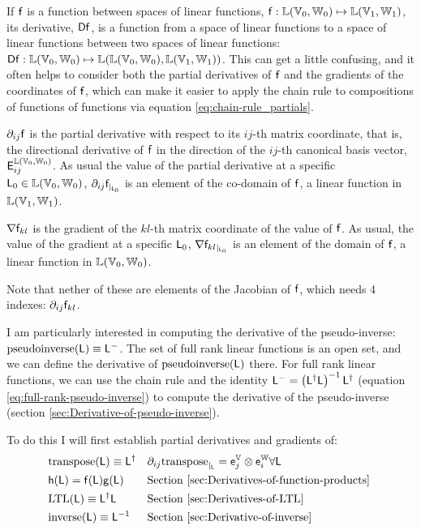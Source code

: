 If $\mathsf{f}$ is a function between spaces of linear functions,
$\mathsf{f} : \mathbb{L}(\mathbb{V}_0,\mathbb{W}_0) \mapsto \mathbb{L}(\mathbb{V}_1,\mathbb{W}_1)$,
its derivative, ${\mathsf{D}{\mathsf{f}}}$,
is a function from a space of linear functions
to a space of linear functions between two
spaces of linear functions:
${\mathsf{D}{\mathsf{f}}} : \mathbb{L}(\mathbb{V}_0,\mathbb{W}_0) \mapsto
\mathbb{L}(\mathbb{L}(\mathbb{V}_0,\mathbb{W}_0), \mathbb{L}(\mathbb{V}_1,\mathbb{W}_1))$.
This can get a little confusing,
and it often helps to consider both the partial derivatives of $\mathsf{f}$
and the gradients of the coordinates of $\mathsf{f}$,
which can make it easier to apply the chain rule to
compositions of functions of functions via equation \ref{eq:chain-rule_partials}.

${\partial}_{ij}{\mathsf{f}}$ is the partial derivative with respect to its $ij$-th matrix coordinate,
that is, the directional derivative of $\mathsf{f}$ in the direction
of the $ij$-th canonical basis vector, $\mathsf{E}_{ij}^{\mathbb{L}(\mathbb{V}_0,\mathbb{W}_0)}$.
As usual the value of the partial derivative at a specific
$\mathsf{L}_0 \in  \mathbb{L}(\mathbb{V}_0,\mathbb{W}_0)$,
${\partial}_{ij}{\mathsf{f}}_{\mid_{\mathsf{L}_0}}$ is an element of the co-domain of $\mathsf{f}$,
a linear function in  $\mathbb{L}(\mathbb{V}_1,\mathbb{W}_1)$.

${\mathbf \nabla}{\mathsf{f}_{kl}}$ is the gradient of the $kl$-th matrix coordinate of the value of $\mathsf{f}$.
As usual, the value of the gradient at a specific $\mathsf{L}_0$,
${\mathbf \nabla}{\mathsf{f}_{kl}}_{\mid_{\mathsf{L}_0}}$ is an element of the domain of $\mathsf{f}$,
a linear function in $\mathbb{L}(\mathbb{V}_0,\mathbb{W}_0)$.

Note that nether of these are elements of the Jacobian of $\mathsf{f}$,
which needs 4 indexes: ${\partial}_{ij}{\mathsf{f}_{kl}}$.

I am particularly interested in computing the derivative of the
pseudo-inverse: $\mathrm{pseudoinverse}(\mathsf{L}) \equiv \mathsf{L}^{-}$.
The set of full rank linear functions is an open set,
and we can define the derivative of $\mathrm{pseudoinverse}(\mathsf{L})$ there.
For full rank linear functions,
we can use the chain rule and the identity
$\mathsf{L}^{-} = \left( \mathsf{L}^{\dagger} \mathsf{L} \right)^{-1} \mathsf{L}^{\dagger}$
(equation \ref{eq:full-rank-pseudo-inverse})
to compute the derivative of the pseudo-inverse
(section \ref{sec:Derivative-of-pseudo-inverse}).

To do this I will first establish partial derivatives and gradients of:
\begin{equation}
\begin{aligned}
\label{eq:transpose-derivative}
&\mathrm{transpose}(\mathsf{L}) \equiv \mathsf{L}^{\dagger}
&&{\partial}_{ij}{\mathrm{transpose}}_{\mid_{\mathsf{L}}} =  \mathsf{e}_j^{\mathbb{V}} \otimes \mathsf{e}_i^{\mathbb{W}}
\forall \mathsf{L}
\\
&\mathsf{h}( \mathsf{L} ) = \mathsf{f} ( \mathsf{L} ) \mathsf{g} ( \mathsf{L} )
&&\text{Section~\ref{sec:Derivatives-of-function-products} }
\\
&\mathrm{LTL}(\mathsf{L}) \equiv \mathsf{L}^{\dagger} \mathsf{L}
&&\text{Section~\ref{sec:Derivatives-of-LTL} }
\\
&\mathrm{inverse}(\mathsf{L}) \equiv \mathsf{L}^{-1}
&&\text{Section~\ref{sec:Derivative-of-inverse} }
\end{aligned}
\end{equation}

